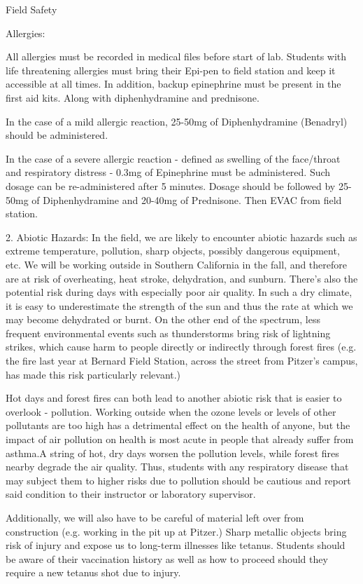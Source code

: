 \documentclass[12pt]{../SOP2}
\begin{document}
\NP Field Safety

Allergies:

All allergies must be recorded in medical files before start of lab. Students with life threatening allergies must bring their Epi-pen to field station and keep it accessible at all times. In addition, backup epinephrine must be present in the first aid kits. Along with diphenhydramine and prednisone. 

In the case of a mild allergic reaction, 25-50mg of Diphenhydramine (Benadryl) should be administered. 

In the case of a severe allergic reaction - defined as swelling of the face/throat and respiratory distress - 0.3mg of Epinephrine must be administered. Such dosage can be re-administered after 5 minutes. Dosage should be followed by 25-50mg of Diphenhydramine and 20-40mg of Prednisone. Then EVAC from field station. 

2. Abiotic Hazards:
In the field, we are likely to encounter abiotic hazards such as extreme temperature, pollution, sharp objects, possibly dangerous equipment, etc. We will be working outside in Southern California in the fall, and therefore are at risk of overheating, heat stroke, dehydration, and sunburn. There’s also the potential risk during days with especially poor air quality. In such a dry climate, it is easy to underestimate the strength of the sun and thus the rate at which we may become dehydrated or burnt.  On the other end of the spectrum, less frequent environmental events such as thunderstorms bring risk of lightning strikes, which cause harm to people directly or indirectly through forest fires (e.g. the fire last year at Bernard Field Station, across the street from Pitzer’s campus, has made this risk particularly relevant.)

Hot days and forest fires can both lead to another abiotic risk that is easier to overlook - pollution. Working outside when the ozone levels or levels of other pollutants are too high has a detrimental effect on the health of anyone, but the impact of air pollution on health is most acute in people that already suffer from asthma.A string of hot, dry days worsen the pollution levels, while forest fires nearby degrade the air quality. Thus, students with any respiratory disease that may subject them to higher risks due to pollution should be cautious and report said condition to their instructor or laboratory supervisor. 

Additionally, we will also have to be careful of material left over from construction (e.g. working in the pit up at Pitzer.) Sharp metallic objects bring risk of injury and expose us to long-term illnesses like tetanus. Students should be aware of their vaccination history as well as how to proceed should they require a new tetanus shot due to injury.
\end{document}
